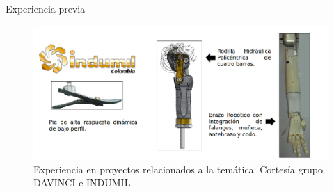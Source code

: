 \documentclass[10pt]{beamer}
\begin{document}
\begin{frame}{Experiencia previa}

\begin{figure}
\begin{centering}
\includegraphics[scale=0.3]{Feathergraphics/experienciaIndumil}
\par\end{centering}
\caption{Experiencia en proyectos relacionados a la temática. Cortesía grupo
DAVINCI e INDUMIL.}

\end{figure}

\end{frame}
\end{document}
